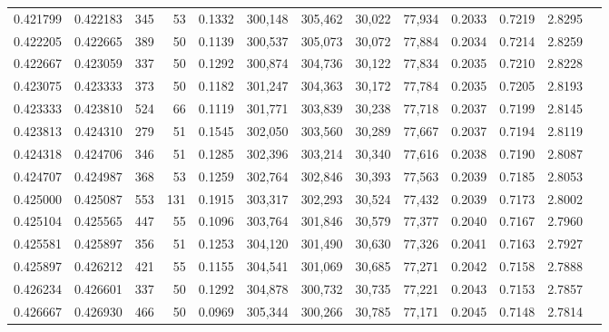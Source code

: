 \begin{tabular}{rrrrrrrrrrrrr}
0.421799 & 0.422183 &    345 &    53 &                                     0.1332 & 300,148 & 305,462 &  30,022 &  77,934 & 0.2033 & 0.7219 & 2.8295 \\
0.422205 & 0.422665 &    389 &    50 &                                     0.1139 & 300,537 & 305,073 &  30,072 &  77,884 & 0.2034 & 0.7214 & 2.8259 \\
0.422667 & 0.423059 &    337 &    50 &                                     0.1292 & 300,874 & 304,736 &  30,122 &  77,834 & 0.2035 & 0.7210 & 2.8228 \\
0.423075 & 0.423333 &    373 &    50 &                                     0.1182 & 301,247 & 304,363 &  30,172 &  77,784 & 0.2035 & 0.7205 & 2.8193 \\
0.423333 & 0.423810 &    524 &    66 &                                     0.1119 & 301,771 & 303,839 &  30,238 &  77,718 & 0.2037 & 0.7199 & 2.8145 \\
0.423813 & 0.424310 &    279 &    51 &                                     0.1545 & 302,050 & 303,560 &  30,289 &  77,667 & 0.2037 & 0.7194 & 2.8119 \\
0.424318 & 0.424706 &    346 &    51 &                                     0.1285 & 302,396 & 303,214 &  30,340 &  77,616 & 0.2038 & 0.7190 & 2.8087 \\
0.424707 & 0.424987 &    368 &    53 &                                     0.1259 & 302,764 & 302,846 &  30,393 &  77,563 & 0.2039 & 0.7185 & 2.8053 \\
0.425000 & 0.425087 &    553 &   131 &                                     0.1915 & 303,317 & 302,293 &  30,524 &  77,432 & 0.2039 & 0.7173 & 2.8002 \\
0.425104 & 0.425565 &    447 &    55 &                                     0.1096 & 303,764 & 301,846 &  30,579 &  77,377 & 0.2040 & 0.7167 & 2.7960 \\
0.425581 & 0.425897 &    356 &    51 &                                     0.1253 & 304,120 & 301,490 &  30,630 &  77,326 & 0.2041 & 0.7163 & 2.7927 \\
0.425897 & 0.426212 &    421 &    55 &                                     0.1155 & 304,541 & 301,069 &  30,685 &  77,271 & 0.2042 & 0.7158 & 2.7888 \\
0.426234 & 0.426601 &    337 &    50 &                                     0.1292 & 304,878 & 300,732 &  30,735 &  77,221 & 0.2043 & 0.7153 & 2.7857 \\
0.426667 & 0.426930 &    466 &    50 &                                     0.0969 & 305,344 & 300,266 &  30,785 &  77,171 & 0.2045 & 0.7148 & 2.7814 \\

\end{tabular}
